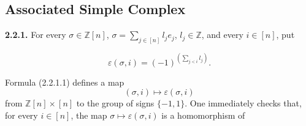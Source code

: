 \subsection{Associated Simple Complex}

\noindent\textbf{2.2.1.}\quad
For every $\sigma\in\mathbb Z[n]$,
$\sigma=\sum_{j\in[n]}l_je_j$, $l_j\in\mathbb Z$, and every $i\in[n]$, put

\begin{equation}
  \varepsilon(\sigma,i)=(-1)^{\left(\sum_{j<i}l_j\right)}.
  \tag{2.2.1.1}
\end{equation}

Formula (2.2.1.1) defines a map
\begin{equation*}
  (\sigma,i)\longmapsto\varepsilon(\sigma,i)
\end{equation*}
from $\mathbb Z[n]\times[n]$ to the group of signs $\{-1,1\}$. One
immediately checks that, for every $i\in[n]$, the map
$\sigma\longmapsto\varepsilon(\sigma,i)$ is a homomorphism of
